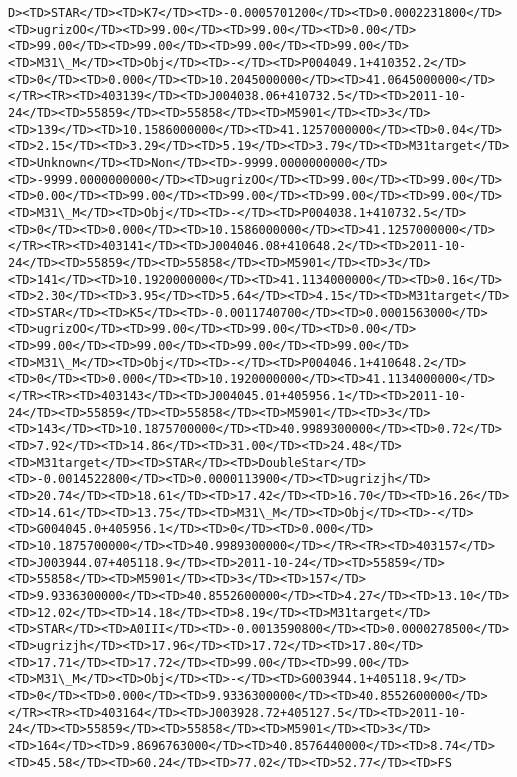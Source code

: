 \documentclass[11pt]{article}
\begin{document}
\begin{Verbatim}[commandchars=\\\{\}]
D><TD>STAR</TD><TD>K7</TD><TD>-0.0005701200</TD><TD>0.0002231800</TD><TD>ugrizOO</TD><TD>99.00</TD><TD>99.00</TD><TD>0.00</TD><TD>99.00</TD><TD>99.00</TD><TD>99.00</TD><TD>99.00</TD><TD>M31\_M</TD><TD>Obj</TD><TD>-</TD><TD>P004049.1+410352.2</TD><TD>0</TD><TD>0.000</TD><TD>10.2045000000</TD><TD>41.0645000000</TD></TR><TR><TD>403139</TD><TD>J004038.06+410732.5</TD><TD>2011-10-24</TD><TD>55859</TD><TD>55858</TD><TD>M5901</TD><TD>3</TD><TD>139</TD><TD>10.1586000000</TD><TD>41.1257000000</TD><TD>0.04</TD><TD>2.15</TD><TD>3.29</TD><TD>5.19</TD><TD>3.79</TD><TD>M31target</TD><TD>Unknown</TD><TD>Non</TD><TD>-9999.0000000000</TD><TD>-9999.0000000000</TD><TD>ugrizOO</TD><TD>99.00</TD><TD>99.00</TD><TD>0.00</TD><TD>99.00</TD><TD>99.00</TD><TD>99.00</TD><TD>99.00</TD><TD>M31\_M</TD><TD>Obj</TD><TD>-</TD><TD>P004038.1+410732.5</TD><TD>0</TD><TD>0.000</TD><TD>10.1586000000</TD><TD>41.1257000000</TD></TR><TR><TD>403141</TD><TD>J004046.08+410648.2</TD><TD>2011-10-24</TD><TD>55859</TD><TD>55858</TD><TD>M5901</TD><TD>3</TD><TD>141</TD><TD>10.1920000000</TD><TD>41.1134000000</TD><TD>0.16</TD><TD>2.30</TD><TD>3.95</TD><TD>5.64</TD><TD>4.15</TD><TD>M31target</TD><TD>STAR</TD><TD>K5</TD><TD>-0.0011740700</TD><TD>0.0001563000</TD><TD>ugrizOO</TD><TD>99.00</TD><TD>99.00</TD><TD>0.00</TD><TD>99.00</TD><TD>99.00</TD><TD>99.00</TD><TD>99.00</TD><TD>M31\_M</TD><TD>Obj</TD><TD>-</TD><TD>P004046.1+410648.2</TD><TD>0</TD><TD>0.000</TD><TD>10.1920000000</TD><TD>41.1134000000</TD></TR><TR><TD>403143</TD><TD>J004045.01+405956.1</TD><TD>2011-10-24</TD><TD>55859</TD><TD>55858</TD><TD>M5901</TD><TD>3</TD><TD>143</TD><TD>10.1875700000</TD><TD>40.9989300000</TD><TD>0.72</TD><TD>7.92</TD><TD>14.86</TD><TD>31.00</TD><TD>24.48</TD><TD>M31target</TD><TD>STAR</TD><TD>DoubleStar</TD><TD>-0.0014522800</TD><TD>0.0000113900</TD><TD>ugrizjh</TD><TD>20.74</TD><TD>18.61</TD><TD>17.42</TD><TD>16.70</TD><TD>16.26</TD><TD>14.61</TD><TD>13.75</TD><TD>M31\_M</TD><TD>Obj</TD><TD>-</TD><TD>G004045.0+405956.1</TD><TD>0</TD><TD>0.000</TD><TD>10.1875700000</TD><TD>40.9989300000</TD></TR><TR><TD>403157</TD><TD>J003944.07+405118.9</TD><TD>2011-10-24</TD><TD>55859</TD><TD>55858</TD><TD>M5901</TD><TD>3</TD><TD>157</TD><TD>9.9336300000</TD><TD>40.8552600000</TD><TD>4.27</TD><TD>13.10</TD><TD>12.02</TD><TD>14.18</TD><TD>8.19</TD><TD>M31target</TD><TD>STAR</TD><TD>A0III</TD><TD>-0.0013590800</TD><TD>0.0000278500</TD><TD>ugrizjh</TD><TD>17.96</TD><TD>17.72</TD><TD>17.80</TD><TD>17.71</TD><TD>17.72</TD><TD>99.00</TD><TD>99.00</TD><TD>M31\_M</TD><TD>Obj</TD><TD>-</TD><TD>G003944.1+405118.9</TD><TD>0</TD><TD>0.000</TD><TD>9.9336300000</TD><TD>40.8552600000</TD></TR><TR><TD>403164</TD><TD>J003928.72+405127.5</TD><TD>2011-10-24</TD><TD>55859</TD><TD>55858</TD><TD>M5901</TD><TD>3</TD><TD>164</TD><TD>9.8696763000</TD><TD>40.8576440000</TD><TD>8.74</TD><TD>45.58</TD><TD>60.24</TD><TD>77.02</TD><TD>52.77</TD><TD>FS       
\end{Verbatim}
\end{document}
